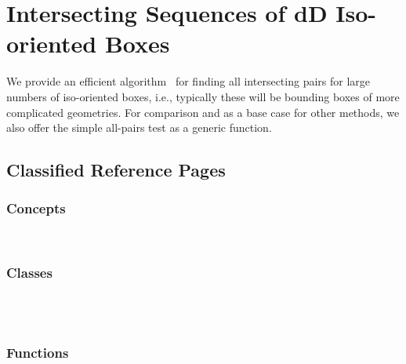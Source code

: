 
\chapter{Intersecting Sequences of dD Iso-oriented Boxes}



We provide an efficient algorithm~\cite{cgal:ze-fsbi-02} for finding all
intersecting pairs for large numbers of iso-oriented boxes, i.e.,
typically these will be bounding boxes of more complicated geometries.
For comparison and as a base case for other methods, we also offer the
simple all-pairs test as a generic function.


\section{Classified Reference Pages}

\subsection*{Concepts}

\\

\subsection*{Classes}

\\
\\

\subsection*{Functions}

